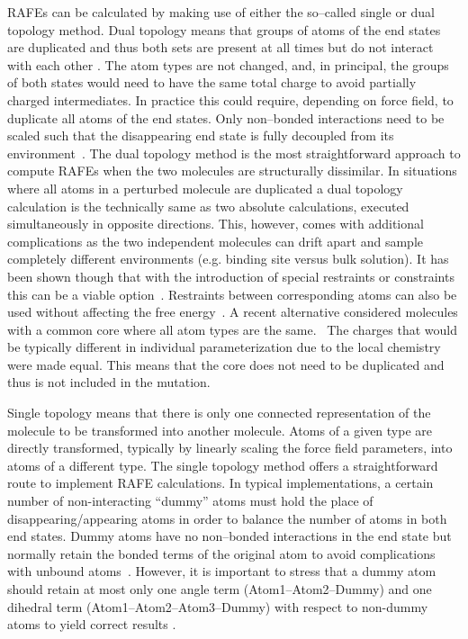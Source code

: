 \documentclass[journal=jctcce,manuscript=article]{achemso}
\begin{document}
RAFEs can be calculated by making use of either the so--called single or dual topology method.
Dual topology means that groups of atoms of the end states are
duplicated and thus both sets are present at all
times but do not interact with each other \cite{doi:10.1021/j100056a020, doi:10.1021/jp981628n}.  The atom types are not changed, and, in principal, the groups
of both states would need to have the same total charge to avoid partially
charged intermediates.  In practice this could require, depending on force field,
to duplicate all atoms of the end states.  Only non--bonded
interactions need to be scaled such that the disappearing end state
is fully decoupled from its environment~\cite{doi:10.1021/jp981628n}.
The dual topology method is the most straightforward approach to compute RAFEs when the two molecules are structurally dissimilar.
In situations where all atoms in a perturbed molecule are duplicated a dual topology calculation is the technically same as two absolute calculations, executed simultaneously in opposite directions.
This, however, comes with additional complications as the two independent
molecules can drift apart and sample completely different environments (e.g. binding site versus bulk solution).
It has been shown though that with the introduction of
special restraints or constraints this can be a viable
option~\cite{doi:10.1021/ct700081t, rocklin_separated_2013, JCC:Axelsen-Li}.
Restraints between corresponding atoms can also be used without affecting the free
energy~\cite{JCC:Axelsen-Li}.  A recent
alternative considered molecules with a
common core where all atom types are the same.~\cite{acs.jctc.6b00794}  The charges that would be
typically different in individual parameterization due to the local chemistry
were made equal.  This means that the core does not need to be duplicated and
thus is not included in the mutation.

Single topology means that there is only one connected representation of the molecule to be transformed into another molecule.
Atoms of a given type are directly transformed, typically by linearly scaling the force field parameters, into atoms of a different type.
The single topology method offers a straightforward route to implement RAFE calculations.\cite{doi:10.1021/j100056a020,Michel2010,doi:10.1063/1.449208, doi:10.1021/jp981628n}
In typical implementations,
a certain number of non-interacting ``dummy'' atoms must hold the place of disappearing/appearing atoms in order to balance the number of atoms in both end states.
Dummy atoms have no non--bonded interactions in the end state but normally retain the bonded
terms of the original atom to avoid complications with unbound
atoms~\cite{doi:10.1021/jp981628n}.
However, it is important to stress that a dummy atom should retain at most only
one angle term (Atom1--Atom2--Dummy) and one dihedral term
(Atom1--Atom2--Atom3--Dummy) with respect to non-dummy atoms
to yield correct results \cite{doi:10.1021/jp981628n,doi:10.1021/jp994193s}.
\end{document}
